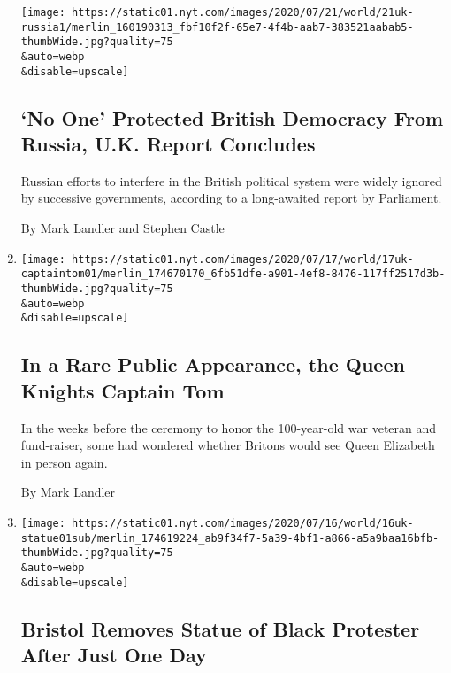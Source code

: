 \begin{enumerate}
  \texttt{[image: https://static01.nyt.com/images/2020/07/21/world/21uk-russia1/merlin\_160190313\_fbf10f2f-65e7-4f4b-aab7-383521aabab5-thumbWide.jpg?quality=75\\\&auto=webp\\\&disable=upscale]}

  \hypertarget{no-one-protected-british-democracy-from-russia-uk-report-concludes}{%
  \subsection{`No One' Protected British Democracy From Russia, U.K.
  Report
  Concludes}\label{no-one-protected-british-democracy-from-russia-uk-report-concludes}}

  Russian efforts to interfere in the British political system were
  widely ignored by successive governments, according to a long-awaited
  report by Parliament.

  By Mark Landler and Stephen Castle
\item
  \href{/2020/07/17/world/europe/queen-knights-captain-tom.html}{}

  \texttt{[image: https://static01.nyt.com/images/2020/07/17/world/17uk-captaintom01/merlin\_174670170\_6fb51dfe-a901-4ef8-8476-117ff2517d3b-thumbWide.jpg?quality=75\\\&auto=webp\\\&disable=upscale]}

  \hypertarget{in-a-rare-public-appearance-the-queen-knights-captain-tom}{%
  \subsection{In a Rare Public Appearance, the Queen Knights Captain
  Tom}\label{in-a-rare-public-appearance-the-queen-knights-captain-tom}}

  In the weeks before the ceremony to honor the 100-year-old war veteran
  and fund-raiser, some had wondered whether Britons would see Queen
  Elizabeth in person again.

  By Mark Landler
\item
  \href{/2020/07/16/world/europe/bristol-statue-removed.html}{}

  \texttt{[image: https://static01.nyt.com/images/2020/07/16/world/16uk-statue01sub/merlin\_174619224\_ab9f34f7-5a39-4bf1-a866-a5a9baa16bfb-thumbWide.jpg?quality=75\\\&auto=webp\\\&disable=upscale]}

  \hypertarget{bristol-removes-statue-of-black-protester-after-just-one-day}{%
  \subsection{Bristol Removes Statue of Black Protester After Just One
  Day}\label{bristol-removes-statue-of-black-protester-after-just-one-day}}


\end{enumerate}
